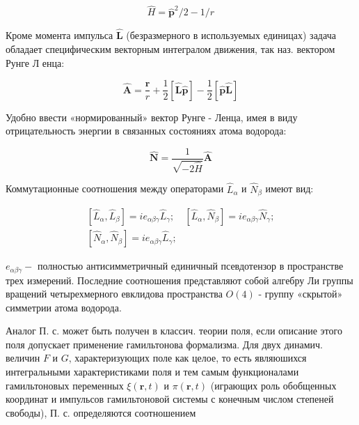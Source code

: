 \documentclass[10pt]{article}
\begin{document}
\[

\hat{H}=\hat{\boldsymbol{p}}^{2} / 2-1 / r

\]



Кроме момента импульса $\hat{\boldsymbol{L}}$ (безразмерного в используемых единицах) задача обладает специфическим векторным интегралом движения, так наз. вектором Рунге Л енца:



\[

\hat{\boldsymbol{A}}=\frac{\boldsymbol{r}}{r}+\frac{1}{2}[\hat{\boldsymbol{L}} \hat{\boldsymbol{p}}]-\frac{1}{2}[\hat{\boldsymbol{p}} \hat{\boldsymbol{L}}]

\]



Удобно ввести «нормированный» вектор Рунге - Ленца, имея в виду отрицательность энергии в связанных состояниях атома водорода:



\[

\hat{\boldsymbol{N}}=\frac{1}{\sqrt{-2 \hat{H}}} \hat{\boldsymbol{A}}

\]



Коммутационные соотношения между операторами $\hat{L}_{\alpha}$ и $\hat{N}_{\beta}$ имеют вид:



\[

\begin{gathered}

{\left[\hat{L}_{\alpha}, \hat{L}_{\beta}\right]=i e_{\alpha \beta \gamma} \hat{L}_{\gamma} ; \quad\left[\hat{L}_{\alpha}, \hat{N}_{\beta}\right]=i e_{\alpha \beta \gamma} \hat{N}_{\gamma} ;} \\

{\left[\hat{N}_{\alpha}, \hat{N}_{\beta}\right]=i e_{\alpha \beta \gamma} \hat{L}_{\gamma} ;}

\end{gathered}

\]



$e_{\alpha \beta \gamma}-$ полностью антисимметричный единичный псевдотензор в пространстве трех измерений. Последние соотношения представляют собой алгебру Ли группы вращений четырехмерного евклидова пространства $O(4)$ - группу «скрытой» симметрии атома водорода.



Аналог П. с. может быть получен в классич. теории поля, если описание этого поля допускает применение гамильтонова формализма. Для двух динамич. величин $F$ и $G$, характеризующих поле как целое, то есть являюшихся интегральными характеристиками поля и тем самым функционалами гамильтоновых переменных $\xi(\boldsymbol{r}, t)$ и $\pi(\boldsymbol{r}, t)$ (играющих роль обобщенных координат и импульсов гамильтоновой системы с конечным числом степеней свободы), П. с. определяются соотношением
\end{document}

